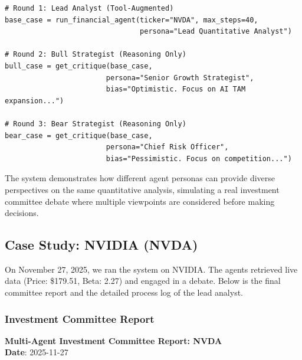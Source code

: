 \documentclass{article}
\begin{document}
\begin{lstlisting}[caption={Multi-Agent System Flow}, label={lst:multi_agent}]
# Round 1: Lead Analyst (Tool-Augmented)
base_case = run_financial_agent(ticker="NVDA", max_steps=40, 
                                persona="Lead Quantitative Analyst")

# Round 2: Bull Strategist (Reasoning Only)
bull_case = get_critique(base_case, 
                        persona="Senior Growth Strategist",
                        bias="Optimistic. Focus on AI TAM expansion...")

# Round 3: Bear Strategist (Reasoning Only)
bear_case = get_critique(base_case,
                        persona="Chief Risk Officer", 
                        bias="Pessimistic. Focus on competition...")
\end{lstlisting}

The system demonstrates how different agent personas can provide diverse perspectives on the same quantitative analysis, simulating a real investment committee debate where multiple viewpoints are considered before making decisions.

\subsection{Case Study: NVIDIA (NVDA)}
On November 27, 2025, we ran the system on NVIDIA. The agents retrieved live data (Price: \$179.51, Beta: 2.27) and engaged in a debate. Below is the final committee report and the detailed process log of the lead analyst.

\subsubsection{Investment Committee Report}

\textbf{Multi-Agent Investment Committee Report: NVDA} \\
\textbf{Date}: 2025-11-27
\end{document}
